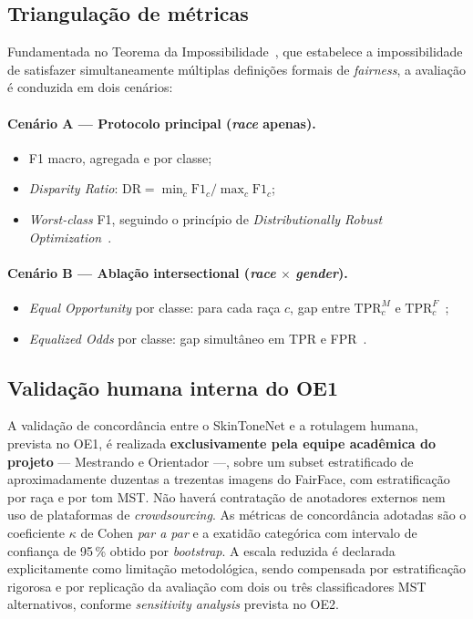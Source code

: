 \subsection{Triangulação de métricas}
\label{sec:metricas}

Fundamentada no Teorema da Impossibilidade~\autocite{kleinberg2017inherent}, que estabelece a impossibilidade de satisfazer simultaneamente múltiplas definições formais de \emph{fairness}, a avaliação é conduzida em dois cenários:

\paragraph{Cenário A --- Protocolo principal (\emph{race} apenas).}
\begin{itemize}
\item F1 macro, agregada e por classe;
\item \emph{Disparity Ratio}: $\mathrm{DR} = \min_c \mathrm{F1}_c / \max_c \mathrm{F1}_c$;
\item \emph{Worst-class} F1, seguindo o princípio de \emph{Distributionally Robust Optimization}~\autocite{sagawa2020distribution}.
\end{itemize}

\paragraph{Cenário B --- Ablação intersectional (\emph{race} $\times$ \emph{gender}).}
\begin{itemize}
\item \emph{Equal Opportunity} por classe: para cada raça $c$, gap entre $\mathrm{TPR}_c^{M}$ e $\mathrm{TPR}_c^{F}$~\autocite{hardt2016equality};
\item \emph{Equalized Odds} por classe: gap simultâneo em TPR e FPR~\autocite{hardt2016equality}.
\end{itemize}

\subsection{Validação humana interna do OE1}
\label{sec:validacao_interna}

A validação de concordância entre o SkinToneNet e a rotulagem humana, prevista no OE1, é realizada \textbf{exclusivamente pela equipe acadêmica do projeto} --- Mestrando e Orientador ---, sobre um subset estratificado de aproximadamente duzentas a trezentas imagens do FairFace, com estratificação por raça e por tom MST. Não haverá contratação de anotadores externos nem uso de plataformas de \emph{crowdsourcing}. As métricas de concordância adotadas são o coeficiente $\kappa$ de Cohen \emph{par a par} e a exatidão categórica com intervalo de confiança de 95\,\% obtido por \emph{bootstrap}. A escala reduzida é declarada explicitamente como limitação metodológica, sendo compensada por estratificação rigorosa e por replicação da avaliação com dois ou três classificadores MST alternativos, conforme \emph{sensitivity analysis} prevista no OE2.

